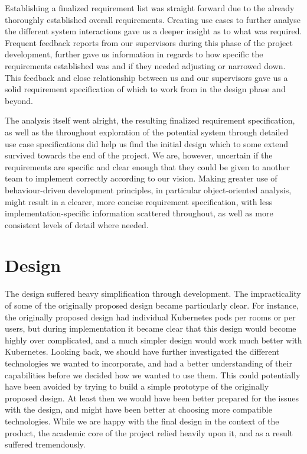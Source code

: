 Establishing a finalized requirement list was straight forward due to the already thoroughly established overall requirements. Creating use cases to further analyse the different system interactions gave us a deeper insight as to what was required. Frequent feedback reports from our supervisors during this phase of the project development, further gave us information in regards to how specific the requirements established was and if they needed adjusting or narrowed down. This feedback and close relationship between us and our supervisors gave us a solid requirement specification of which to work from in the design phase and beyond. 

The analysis itself went alright, the resulting finalized requirement specification, as well as the throughout exploration of the potential system through detailed use case specifications did help us find the initial design which to some extend survived towards the end of the project. We are, however, uncertain if the requirements are specific and clear enough that they could be given to another team to implement correctly according to our vision. Making greater use of behaviour-driven development principles, in particular object-oriented analysis, might result in a clearer, more concise requirement specification, with less implementation-specific information scattered throughout, as well as more consistent levels of detail where needed.

\section{Design}

The design suffered heavy simplification through development. The impracticality of some of the originally proposed design became particularly clear. For instance, the originally proposed design had individual Kubernetes pods per rooms or per users, but during implementation it became clear that this design would become highly over complicated, and a much simpler design would work much better with Kubernetes. Looking back, we should have further investigated the different technologies we wanted to incorporate, and had a better understanding of their capabilities before we decided how we wanted to use them. This could potentially have been avoided by trying to build a simple prototype of the originally proposed design. At least then we would have been better prepared for the issues with the design, and might have been better at choosing more compatible technologies. While we are happy with the final design in the context of the product, the academic core of the project relied heavily upon it, and as a result suffered tremendously.

